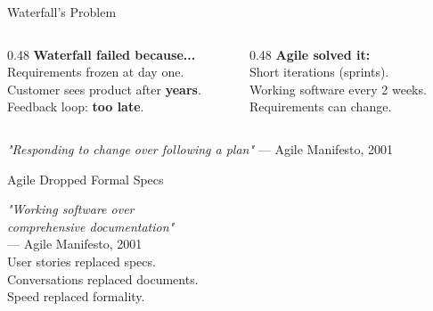 \documentclass[aspectratio=169,18pt]{beamer}
\begin{document}
\begin{frame}{Waterfall's Problem}
  \vspace{0.3em}
  \begin{columns}[T]
    \begin{column}{0.48\textwidth}
      \textbf{\color{openred}Waterfall failed because...}\\[0.6em]
      \normalsize
      Requirements frozen at day one.\\[0.4em]
      Customer sees product after \textbf{years}.\\[0.4em]
      Feedback loop: \textbf{too late}.
    \end{column}
    \begin{column}{0.48\textwidth}
      \textbf{\color{opengreen}Agile solved it:}\\[0.6em]
      \normalsize
      Short iterations (sprints).\\[0.4em]
      Working software every 2 weeks.\\[0.4em]
      Requirements can change.
    \end{column}
  \end{columns}
  \vspace{1em}
  \small\color{opengray}\textit{"Responding to change over following a plan"} — Agile Manifesto, 2001
\end{frame}

\begin{frame}{Agile Dropped Formal Specs}
  \vspace{1em}
  \begin{center}
    \Large\textit{"Working software over\\
    comprehensive documentation"}\\[1em]
    \normalsize\color{opengray}— Agile Manifesto, 2001\\[1.5em]
    \normalsize\color{black}
    User stories replaced specs.\\
    Conversations replaced documents.\\
    Speed replaced formality.
  \end{center}
\end{frame}
\end{document}
